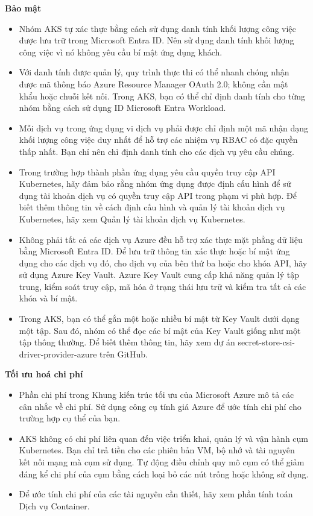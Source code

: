 \textbf{Bảo mật}
    \begin{itemize}
        \item Nhóm AKS tự xác thực bằng cách sử dụng danh tính khối lượng công việc được lưu trữ trong Microsoft Entra ID. Nên sử dụng danh tính khối lượng công việc vì nó không yêu cầu bí mật ứng dụng khách.
        \item Với danh tính được quản lý, quy trình thực thi có thể nhanh chóng nhận được mã thông báo Azure Resource Manager OAuth 2.0; không cần mật khẩu hoặc chuỗi kết nối. Trong AKS, bạn có thể chỉ định danh tính cho từng nhóm bằng cách sử dụng ID Microsoft Entra Workload.
        \item Mỗi dịch vụ trong ứng dụng vi dịch vụ phải được chỉ định một mã nhận dạng khối lượng công việc duy nhất để hỗ trợ các nhiệm vụ RBAC có đặc quyền thấp nhất. Bạn chỉ nên chỉ định danh tính cho các dịch vụ yêu cầu chúng.
        \item Trong trường hợp thành phần ứng dụng yêu cầu quyền truy cập API Kubernetes, hãy đảm bảo rằng nhóm ứng dụng được định cấu hình để sử dụng tài khoản dịch vụ có quyền truy cập API trong phạm vi phù hợp. Để biết thêm thông tin về cách định cấu hình và quản lý tài khoản dịch vụ Kubernetes, hãy xem Quản lý tài khoản dịch vụ Kubernetes.
        \item Không phải tất cả các dịch vụ Azure đều hỗ trợ xác thực mặt phẳng dữ liệu bằng Microsoft Entra ID. Để lưu trữ thông tin xác thực hoặc bí mật ứng dụng cho các dịch vụ đó, cho dịch vụ của bên thứ ba hoặc cho khóa API, hãy sử dụng Azure Key Vault. Azure Key Vault cung cấp khả năng quản lý tập trung, kiểm soát truy cập, mã hóa ở trạng thái lưu trữ và kiểm tra tất cả các khóa và bí mật.
        \item Trong AKS, bạn có thể gắn một hoặc nhiều bí mật từ Key Vault dưới dạng một tập. Sau đó, nhóm có thể đọc các bí mật của Key Vault giống như một tập thông thường. Để biết thêm thông tin, hãy xem dự án secret-store-csi-driver-provider-azure trên GitHub.    
    \end{itemize}
\textbf{Tối ưu hoá chi phí}
    \begin{itemize}
        \item Phần chi phí trong Khung kiến trúc tối ưu của Microsoft Azure mô tả các cân nhắc về chi phí. Sử dụng công cụ tính giá Azure để ước tính chi phí cho trường hợp cụ thể của bạn.
        \item AKS không có chi phí liên quan đến việc triển khai, quản lý và vận hành cụm Kubernetes. Bạn chỉ trả tiền cho các phiên bản VM, bộ nhớ và tài nguyên kết nối mạng mà cụm sử dụng. Tự động điều chỉnh quy mô cụm có thể giảm đáng kể chi phí của cụm bằng cách loại bỏ các nút trống hoặc không sử dụng.
        \item Để ước tính chi phí của các tài nguyên cần thiết, hãy xem phần tính toán Dịch vụ Container.
    \end{itemize}

